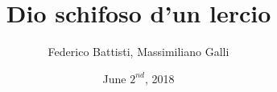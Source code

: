 \documentclass[a4paper]{article}
\begin{document}
\title{Dio schifoso d'un lercio}
\author{Federico Battisti, Massimiliano Galli}
\date{June $2^{nd}$, 2018}
\maketitle
\end{document}
